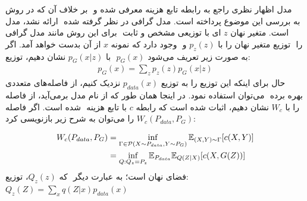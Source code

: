 بر خلاف آن که در روش ‎\aae{}‎ اظهار نظری راجع به رابطه تابع هزینه معرفی شده و ‎\likelihood{}‎ مدل ارائه نشد، مدل ‎\wae{}‎ به بررسی این موضوع پرداخته است.
مدل گرافی در نظر گرفته شده برای این روش مانند مدل گرافی ‎\vae{}‎ است. متغیر نهان $z$ ای با توزیعی مشخص و ثابت وجود دارد که نمونه $x$ از آن بدست خواهد آمد. اگر ‎\priordist{}‎ متغیر نهان را با $p_z(z)$ و ‎توزیع ‎‎‎\decoder{}‎‎ را با $p_G(x|z)$ نشان دهیم، توزیع ‎\marginal{}‎
$p_G(x)$
به صورت زیر تعریف می‌شود:
\begin{gather}
	p_G(x) = \sum_z p_z(z) p_G(x|z)
\end{gather}
حال برای اینکه این توزیع را به توزیع $p_{data}‎(x)$ نزدیک کنیم، از فاصله‌های متعددی می‌توان استفاده نمود. در اینجا همان طور که از نام مدل بر‌می‌آید، از فاصله ‎‎‎‎‎ بهره برده شده است. اگر فاصله ‎‎\wasser{}‎ با تابع هزینه $c$‎ را با $W_c$ نشان دهیم، اثبات شده است که رابطه $W_c(P_{data}‎, P_G)$ را می‌توان به شرح زیر بازنویسی کرد:

\begin{gather}\label{eq:wae_constrained}
	\begin{align}
		W_c(P_{data}, P_G) & = \inf_{\Gamma \in \mathcal{P}(X \sim P_{data}, Y \sim P_G)} \expected_{(X,Y) \sim \Gamma} [c(X,Y)] \nonumber \\
		                   & = \inf_{Q: Q_z = P_z} \expected_{P_{data}} \expected_{Q(Z|X)} [c(X, G(Z))]
	\end{align}
\end{gather}
که $Q_z(z)$، توزیع ‎\marginal{}‎ فضای نهان است؛ به عبارت دیگر:‌$Q_z(Z) = ‎\sum_x q(Z|x)p_{data}‎(x)$

